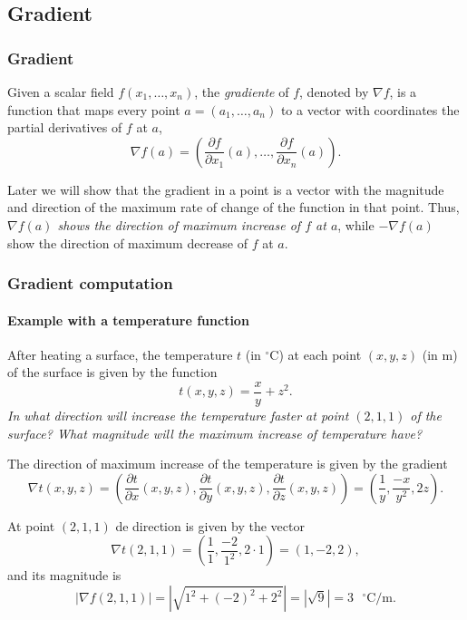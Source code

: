 \subsection{Gradient}
\begin{frame}
\frametitle{Gradient}
\begin{definition}[Gradient]
Given a scalar field $f(x_1,\ldots,x_n)$, the \emph{gradiente} of $f$, denoted by $\nabla f$, is a function that maps every point
$a=(a_1,\ldots,a_n)$ to a vector with coordinates the partial derivatives of $f$ at $a$,
\[
\nabla f(a)=\left(\frac{\partial f}{\partial x_1}(a),\ldots,\frac{\partial f}{\partial x_n}(a)\right).
\]
\end{definition}

Later we will show that the gradient in a point is a vector with the magnitude and direction of the maximum rate of change of the function in that point.
Thus, \alert{\emph{$\nabla f(a)$ shows the direction of maximum increase of $f$ at $a$}}, while $-\nabla f(a)$ show the direction of maximum decrease of $f$ at $a$.
\end{frame}



\begin{frame}
\frametitle{Gradient computation}
\framesubtitle{Example with a temperature function}

After heating a surface, the temperature $t$ (in $^\circ$C) at each point $(x,y,z)$ (in m) of the surface is given by the function 
\[
t(x,y,z)=\frac{x}{y}+z^2.
\]
\emph{In what direction will increase the temperature faster at point $(2,1,1)$ of the surface?
What magnitude will the maximum increase of temperature have?}

The direction of maximum increase of the temperature is given by the gradient
\[
\nabla t(x,y,z)=\left(\frac{\partial t}{\partial x}(x,y,z),\frac{\partial t}{\partial y}(x,y,z),\frac{\partial t}{\partial
z}(x,y,z)\right)=\left(\frac{1}{y},\frac{-x}{y^2},2z\right).
\]

At point $(2,1,1)$ de direction is given by the vector
\[
\nabla t(2,1,1)=\left(\frac{1}{1},\frac{-2}{1^2},2\cdot 1\right)=(1,-2,2),
\]
and its magnitude is
\[
|\nabla f(2,1,1)|=|\sqrt{1^2+(-2)^2+2^2}|=|\sqrt{9}|=3 \mbox{ $^\circ$C/m}.
\]
\end{frame}

